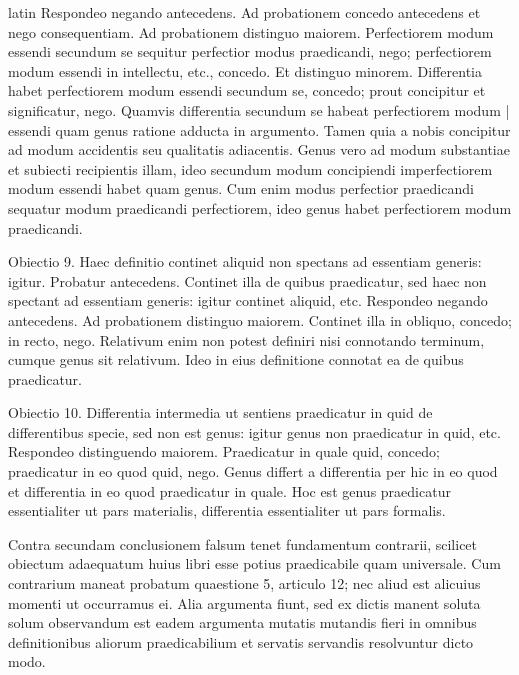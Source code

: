 \begin{otherlanguage*}{latin}
\pstart
  Respondeo negando antecedens. Ad probationem concedo antecedens et nego consequentiam. Ad probationem distinguo maiorem. Perfectiorem modum essendi secundum se sequitur perfectior modus praedicandi, nego; perfectiorem modum essendi in intellectu, etc., concedo. Et distinguo minorem. Differentia habet perfectiorem modum essendi secundum se, concedo; prout concipitur et significatur, nego. Quamvis differentia secundum se habeat perfectiorem modum \textnormal{|} essendi quam genus ratione adducta in argumento. Tamen quia a nobis concipitur ad modum accidentis seu qualitatis adiacentis. Genus vero ad modum substantiae et subiecti recipientis illam, ideo secundum modum concipiendi imperfectiorem modum essendi habet quam genus. Cum enim modus perfectior praedicandi sequatur modum praedicandi perfectiorem, ideo genus habet perfectiorem modum praedicandi. 
\pend

\pstart
  Obiectio 9. Haec definitio continet aliquid non spectans ad essentiam generis: igitur. Probatur antecedens. Continet illa de quibus praedicatur, sed haec non spectant ad essentiam generis: igitur continet aliquid, etc. Respondeo negando antecedens. Ad probationem distinguo maiorem. Continet illa in obliquo, concedo; in recto, nego. Relativum enim non potest definiri nisi connotando terminum, cumque genus sit relativum. Ideo in eius definitione connotat ea de quibus praedicatur. 
\pend

\pstart
  Obiectio 10. Differentia intermedia ut sentiens praedicatur in quid de differentibus specie, sed non est genus: igitur genus non praedicatur in quid, etc. Respondeo distinguendo maiorem. Praedicatur in quale quid, concedo; praedicatur in eo quod quid, nego. Genus differt a differentia per hic in eo quod et differentia in eo quod praedicatur in quale. Hoc est genus praedicatur essentialiter ut pars materialis, differentia essentialiter ut pars formalis. 
\pend

\pstart
  Contra secundam conclusionem falsum tenet fundamentum contrarii, scilicet obiectum adaequatum huius libri esse potius praedicabile quam universale. Cum contrarium maneat probatum quaestione 5, articulo 12; nec aliud est alicuius momenti ut occurramus ei. Alia argumenta fiunt, sed ex dictis manent soluta solum observandum est eadem argumenta mutatis mutandis fieri in omnibus definitionibus aliorum praedicabilium et servatis servandis resolvuntur dicto modo. 
\pend

        \pstart
        \pend
      

\end{otherlanguage*}
